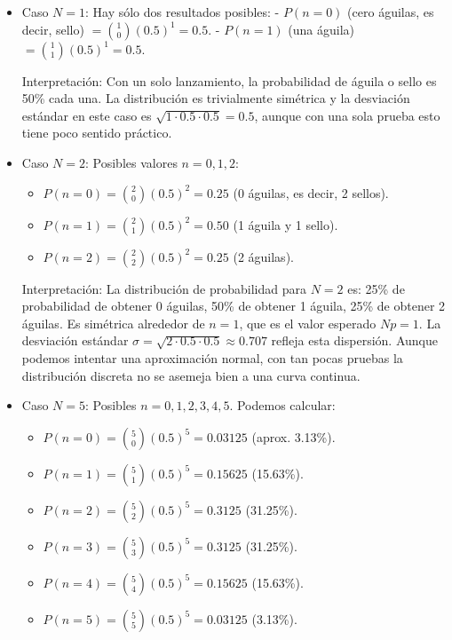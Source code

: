 \documentclass[11pt,letterpaper]{article}
\begin{document}
\begin{itemize}
  \item Caso $N=1$: Hay sólo dos resultados posibles:
    - $P(n=0)$ (cero águilas, es decir, sello) $= \binom{1}{0}(0.5)^1 = 0.5$.
    - $P(n=1)$ (una águila) $= \binom{1}{1}(0.5)^1 = 0.5$.
    
    Interpretación: Con un solo lanzamiento, la probabilidad de águila o sello es 50\% cada una. La distribución es trivialmente simétrica y la desviación estándar en este caso es $\sqrt{1\cdot0.5\cdot0.5}=0.5$, aunque con una sola prueba esto tiene poco sentido práctico.
    
  \item Caso $N=2$: Posibles valores $n=0,1,2$:
  \begin{itemize}
    \item $P(n=0) = \binom{2}{0}(0.5)^2 = 0.25$ (0 águilas, es decir, 2 sellos).
    \item $P(n=1) = \binom{2}{1}(0.5)^2 = 0.50$ (1 águila y 1 sello).
    \item $P(n=2) = \binom{2}{2}(0.5)^2 = 0.25$ (2 águilas).
  \end{itemize}
    
    Interpretación: La distribución de probabilidad para $N=2$ es: 25\% de probabilidad de obtener 0 águilas, 50\% de obtener 1 águila, 25\% de obtener 2 águilas. Es simétrica alrededor de $n=1$, que es el valor esperado $Np=1$. La desviación estándar $\sigma=\sqrt{2\cdot0.5\cdot0.5}\approx0.707$ refleja esta dispersión. Aunque podemos intentar una aproximación normal, con tan pocas pruebas la distribución discreta no se asemeja bien a una curva continua.
    
  \item Caso $N=5$: Posibles $n=0,1,2,3,4,5$. Podemos calcular:
  \begin{itemize}
    \item $P(n=0) = \binom{5}{0}(0.5)^5 = 0.03125$ (aprox. 3.13\%).
    \item $P(n=1) = \binom{5}{1}(0.5)^5 = 0.15625$ (15.63\%).
    \item $P(n=2) = \binom{5}{2}(0.5)^5 = 0.3125$  (31.25\%).
    \item $P(n=3) = \binom{5}{3}(0.5)^5 = 0.3125$  (31.25\%).
    \item $P(n=4) = \binom{5}{4}(0.5)^5 = 0.15625$ (15.63\%).
    \item $P(n=5) = \binom{5}{5}(0.5)^5 = 0.03125$ (3.13\%).
  \end{itemize}


\end{itemize}
\end{document}
